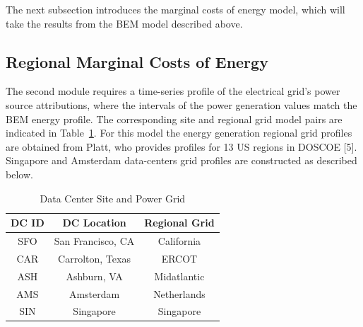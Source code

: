 



  The next subsection introduces the marginal costs of energy model, which will take the results from the BEM model described above.

\subsection{Regional Marginal Costs of Energy}
The second module requires a time-series profile of the electrical grid’s power source attributions, where the intervals of the power generation values match the BEM energy profile. The corresponding  site and regional grid model pairs are indicated in Table~\ref{table:tab02}. For this model the energy generation regional grid profiles are obtained from Platt, who provides profiles for 13 US regions in DOSCOE [5]. Singapore and Amsterdam data-centers grid profiles are constructed as described below.

\begin{table}[ht]
  \vspace{-10 pt}
  \caption{Data Center Site and Power Grid}
  \label{table:tab02}
  \centering
  \begin{tabular}{| c | c | c |  }
    \hline
    \bf{DC ID} & \bf{DC Location} & \bf{Regional Grid} \\
    \hline
    SFO & San Francisco, CA & California \\
    \hline
    CAR & Carrolton, Texas & ERCOT \\
    \hline
    ASH & Ashburn, VA & Midatlantic \\
    \hline
    AMS & Amsterdam & Netherlands \\
    \hline
    SIN & Singapore & Singapore \\
    \hline
  \end{tabular}
  \vspace{-10 pt}   %
  \end{table}

